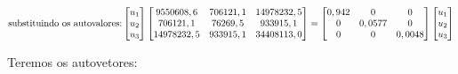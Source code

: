 \documentclass[
]{book}
\begin{document}
\[\mbox{substituindo os autovalores:}\\
\begin{bmatrix}
u_1\\ u_2 \\ u_3
\end{bmatrix}
\begin{bmatrix}
9550608,6  &706121,1 &14978232,5\\ 
706121,1 &76269,5 & 933915,1 \\
14978232,5&933915,1&34408113,0
\end{bmatrix}  = \begin{bmatrix}0,942&0&0 \\ 0&0,0577&0 \\0&0& 0,0048 \end{bmatrix}\begin{bmatrix}
u_1\\ u_2 \\ u_3
\end{bmatrix}\]

Teremos os autovetores:
\end{document}
